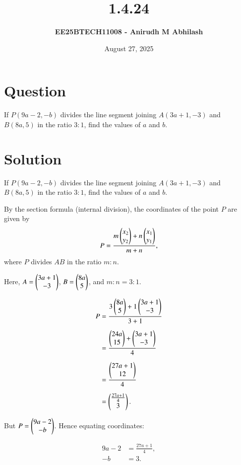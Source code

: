 \documentclass[12pt]{article}
\title{\textbf{1.4.24}}
\author{\textbf{EE25BTECH11008 - Anirudh M Abhilash}}
\date{August 27, 2025}
\begin{document}
\maketitle

\section*{Question}

If $P(9a - 2, -b)$ divides the line segment joining $A(3a + 1, -3)$ and $B(8a, 5)$ in the ratio $3:1$, find the values of $a$ and $b$.


\section*{Solution}
    
If $P(9a - 2, -b)$ divides the line segment joining $A(3a + 1, -3)$ and $B(8a, 5)$ in the ratio $3:1$, find the values of $a$ and $b$.

By the section formula (internal division), the coordinates of the point $P$ are given by  
\[
P = \frac{m \begin{pmatrix}x_2 \\ y_2\end{pmatrix} + n \begin{pmatrix}x_1 \\ y_1\end{pmatrix}}{m+n},
\]  
where $P$ divides $AB$ in the ratio $m:n$.


Here, $A = \begin{pmatrix}3a+1 \\ -3\end{pmatrix}$, $B = \begin{pmatrix}8a \\ 5\end{pmatrix}$, and $m:n = 3:1$.  

\begin{align}
P &= \frac{3\begin{pmatrix}8a \\ 5\end{pmatrix} + 1\begin{pmatrix}3a+1 \\ -3\end{pmatrix}}{3+1} \\[6pt]
  &= \frac{\begin{pmatrix}24a \\ 15\end{pmatrix} + \begin{pmatrix}3a+1 \\ -3\end{pmatrix}}{4} \\[6pt]
  &= \frac{\begin{pmatrix}27a+1 \\ 12\end{pmatrix}}{4} \\[6pt]
  &= \begin{pmatrix}\tfrac{27a+1}{4} \\ 3\end{pmatrix}.
\end{align}

But $P = \begin{pmatrix}9a-2 \\ -b\end{pmatrix}$. Hence equating coordinates:  

\begin{align}
9a - 2 &= \tfrac{27a+1}{4}, \label{eq1} \\[6pt]
-b &= 3. \label{eq2}
\end{align}
\end{document}

